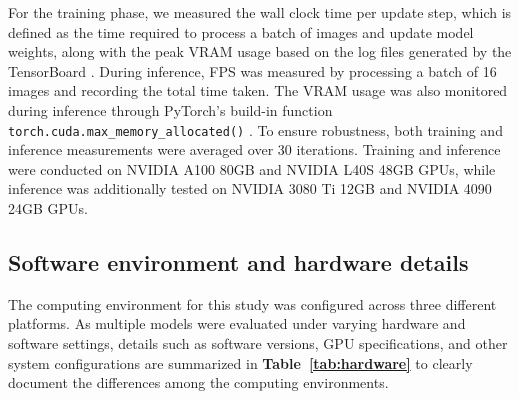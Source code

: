 For the training phase, we measured the wall clock time per update step, which is defined as the time required to process a batch of images and update model weights, along with the peak VRAM usage based on the log files generated by the TensorBoard \citep{martin_abadi_tensorflow_2015}. During inference, FPS was measured by processing a batch of 16 images and recording the total time taken. The VRAM usage was also monitored during inference through PyTorch's build-in function \texttt{torch.cuda.max\_memory\_allocated()} \citep{paszke_pytorch_2019}. To ensure robustness, both training and inference measurements were averaged over 30 iterations. Training and inference were conducted on NVIDIA A100 80GB and NVIDIA L40S 48GB GPUs, while inference was additionally tested on NVIDIA 3080 Ti 12GB and NVIDIA 4090 24GB GPUs.

\subsection*{Software environment and hardware details}
The computing environment for this study was configured across three different platforms. As multiple models were evaluated under varying hardware and software settings, details such as software versions, GPU specifications, and other system configurations are summarized in \textbf{Table~\ref{tab:hardware}} to clearly document the differences among the computing environments.

